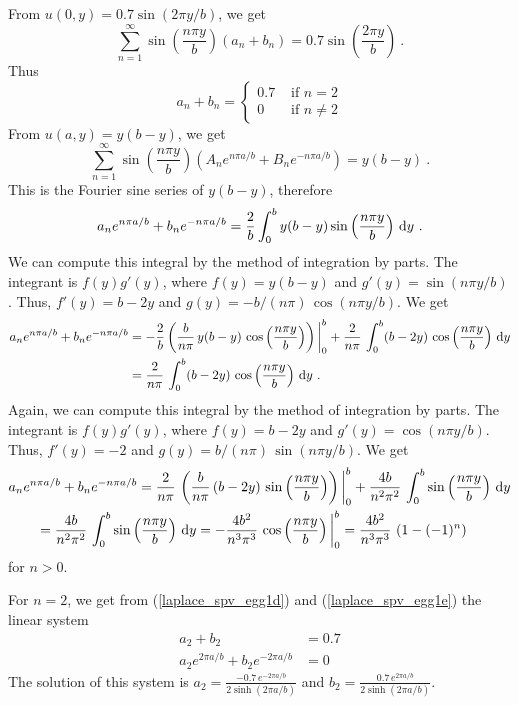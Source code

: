 \begin{egg}
From $\displaystyle u(0,y) = 0.7 \sin\left(2\pi y/b\right)$,
we get
\[
\sum_{n=1}^\infty \sin\left(\frac{n\pi y}{b}\right)
\left(a_n + b_n \right) = 0.7 \sin\left(\frac{2\pi y}{b}\right) \  .
\]
Thus
\begin{equation} \label{laplace_spv_egg1d}
a_n+b_n = \begin{cases} 0.7 & \text{ if } n = 2 \\
0 & \text{ if } n\neq 2
\end{cases}
\end{equation}
From $\displaystyle u(a,y) = y(b-y)$, we get
\[
\sum_{n=1}^\infty \sin\left(\frac{n\pi y}{b}\right)
\left(A_n e^{n\pi a/b} + B_n e^{-n\pi a/b} \right) = y(b-y) \ .
\]
This is the Fourier sine series of $y(b-y)$, therefore
\[
a_n e^{n\pi a/b} + b_n e^{-n\pi a/b} =
\frac{2}{b} \int_0^b y(b-y) \sin\left(\frac{n\pi y}{b}\right) \dx{y} \ .
\]
We can compute this integral by the method of integration by parts.
The integrant is $f(y)g'(y)$, where $f(y)=y(b-y)$ and
$\displaystyle g'(y) = \sin\left(n\pi y/b\right)$.  Thus,
$f'(y) = b-2y$ and
$\displaystyle g(y) = -b/(n\pi)\,\cos\left(n\pi y/b\right)$.
We get
\begin{align*}
a_n e^{n\pi a/b} + b_n e^{-n\pi a/b}
&= -\frac{2}{b}\left(\frac{b}{n\pi}\,y(b-y)\,
\cos\left(\frac{n\pi y}{b}\right)\right)\bigg|_0^b +
\frac{2}{n\pi}\,\int_0^b (b-2y)\,\cos\left(\frac{n\pi y}{b}\right)\,\mathrm{d}{y} \\
&=
\frac{2}{n\pi}\,\int_0^b (b-2y)\,\cos\left(\frac{n\pi y}{b}\right)\,\mathrm{d}{y} \ .
\end{align*}
Again, we can compute this integral by the method of integration by
parts.  The integrant is $f(y)g'(y)$, where $f(y)=b-2y$ and
$\displaystyle g'(y) = \cos\left(n\pi y/b\right)$.  Thus,
$f'(y) = -2$ and $\displaystyle g(y) =
b/(n\pi)\,\sin\left(n\pi y/b\right)$.  We get
\begin{align}
&a_n e^{n\pi a/b} + b_n e^{-n\pi a/b}
= \frac{2}{n\pi}\,\left(\frac{b}{n\pi}\,(b-2y)\,
\sin\left(\frac{n\pi y}{b}\right) \right)\bigg|_0^b +
\frac{4b}{n^2\pi^2}\,\int_0^b \sin\left(\frac{n\pi y}{b}\right)\,\mathrm{d}{y}
\nonumber \\
&\qquad = \frac{4b}{n^2\pi^2}\,\int_0^b \sin\left(\frac{n\pi y}{b}\right)\,\mathrm{d}{y}
=- \frac{4b^2}{n^3\pi^3}\,\cos\left(\frac{n\pi y}{b}\right)\bigg|_0^b
= \frac{4b^2}{n^3\pi^3}\,\left( 1 - (-1)^n\right)  \label{laplace_spv_egg1e}
\end{align}
for $n > 0$. 

For $n=2$, we get from (\ref{laplace_spv_egg1d}) and
(\ref{laplace_spv_egg1e}) the linear system
\begin{align*}
a_2 + b_2 &= 0.7 \\
a_2 e^{2\pi a/b} + b_2 e^{-2\pi a/b} &= 0
\end{align*}
The solution of this system is
$\displaystyle a_2 = \frac{-0.7\,e^{-2\pi a/b}}{2\sinh(2\pi a/b)}$
and $\displaystyle b_2 = \frac{0.7\,e^{2\pi a/b}}{2\sinh(2\pi a/b)}$.


\end{egg}
